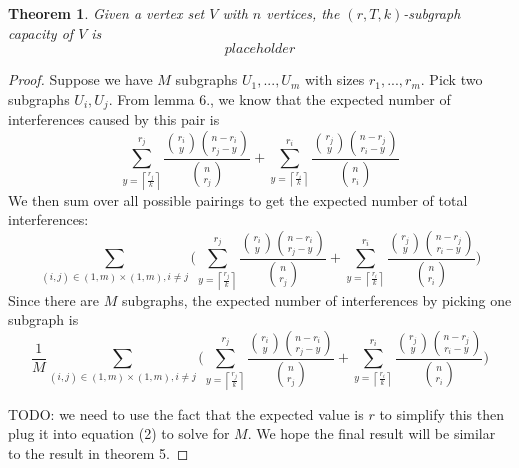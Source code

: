 \documentclass[10pt]{extarticle}
\newtheorem{theorem}{Theorem}
\theoremstyle{definition}
\begin{document}
\begin{theorem}
    Given a vertex set $V$ with $n$ vertices, the $(r,T,k)$-subgraph capacity of $V$ is 
    \begin{equation*}
        placeholder
    \end{equation*}
\end{theorem}

\begin{proof}
    Suppose we have $M$ subgraphs $U_1,...,U_m$ with sizes $r_1,...,r_m$. Pick two subgraphs $U_i,U_j$. From lemma 6., we know that the expected number of interferences caused by this pair is
    $$
    \sum_{y = \left\lceil \frac{r_j}{k} \right\rceil}^{r_j}  \frac{\binom{r_i}{y} \binom{n-r_i}{r_j-y}}{\binom{n}{r_j}} + \sum_{y = \left\lceil \frac{r_i}{k} \right\rceil}^{r_i}  \frac{\binom{r_j}{y} \binom{n-r_j}{r_i-y}}{\binom{n}{r_i}}
    $$
    We then sum over all possible pairings to get the expected number of total interferences:
    $$
    \sum_{(i,j) \in (1,m)\times(1,m), i \ne j} \Biggl( \sum_{y = \left\lceil \frac{r_j}{k} \right\rceil}^{r_j}  \frac{\binom{r_i}{y} \binom{n-r_i}{r_j-y}}{\binom{n}{r_j}} + \sum_{y = \left\lceil \frac{r_i}{k} \right\rceil}^{r_i}  \frac{\binom{r_j}{y} \binom{n-r_j}{r_i-y}}{\binom{n}{r_i}} \Biggr)
    $$
    Since there are $M$ subgraphs, the expected number of interferences by picking one subgraph is
    $$
    \frac{1}{M} \sum_{(i,j) \in (1,m)\times(1,m), i \ne j} \Biggl( \sum_{y = \left\lceil \frac{r_j}{k} \right\rceil}^{r_j}  \frac{\binom{r_i}{y} \binom{n-r_i}{r_j-y}}{\binom{n}{r_j}} + \sum_{y = \left\lceil \frac{r_i}{k} \right\rceil}^{r_i}  \frac{\binom{r_j}{y} \binom{n-r_j}{r_i-y}}{\binom{n}{r_i}} \Biggr)
    $$


    
    TODO: we need to use the fact that the expected value is $r$ to simplify this then plug it into equation (2) to solve for $M$. We hope the final result will be similar to the result in theorem 5.

    
\end{proof}
\end{document}
